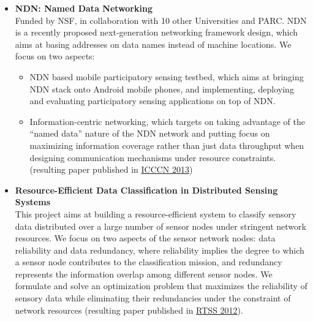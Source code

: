 \begin{itemize}
	\item \textbf{NDN: Named Data Networking} \\
	Funded by NSF, in collaboration with 10 other Universities and PARC. NDN is a recently proposed next-generation networking framework design, which aims at basing addresses on data names instead of machine locations. We focus on two aspects: 
	\begin{itemize}
		\item NDN based mobile participatory sensing testbed, which aims at bringing NDN stack onto Android mobile phones, and implementing, deploying and evaluating participatory sensing applications on top of NDN. 
		\item Information-centric networking, which targets on taking advantage of the ``named data'' nature of the NDN network and putting focus on maximizing information coverage rather than just data throughput when designing communication mechanisms under resource constraints. (resulting paper published in \hyperlink{wang2013icccn}{\textsc{ICCCN 2013}}) 
	\end{itemize}
	
	\item \textbf{Resource-Efficient Data Classification in Distributed Sensing Systems} \\
	This project aims at building a resource-efficient system to classify sensory data distributed over a large number of sensor nodes under stringent network resources. We focus on two aspects of the sensor network nodes: data reliability and data redundancy, where reliability implies the degree to which a sensor node contributes to the classification mission, and redundancy represents the information overlap among different sensor nodes. We formulate and solve an optimization problem that maximizes the reliability of sensory data while eliminating their redundancies under the constraint of network resources (resulting paper published in \hyperlink{su2013rtss}{\textsc{RTSS 2012}}). 
\end{itemize}

